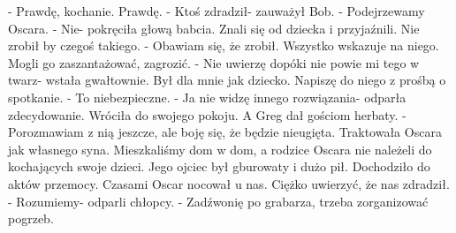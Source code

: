\documentclass[12pt,a4paper]{book}
\begin{document}
- Prawdę, kochanie. Prawdę. 
- Ktoś zdradził- zauważył Bob. 
- Podejrzewamy Oscara. 
- Nie- pokręciła głową babcia. Znali się od dziecka i przyjaźnili. Nie zrobił by czegoś takiego. 
- Obawiam się, że zrobił. Wszystko wskazuje na niego. Mogli go zaszantażować, zagrozić. 
- Nie uwierzę dopóki nie powie mi tego w twarz- wstała gwałtownie. Był dla mnie jak dziecko. Napiszę do niego z prośbą o spotkanie. 
- To niebezpieczne. 
- Ja nie widzę innego rozwiązania- odparła zdecydowanie. 
Wróciła do swojego pokoju. A Greg dał gościom herbaty. 
- Porozmawiam z nią jeszcze, ale boję się, że będzie nieugięta. Traktowała Oscara jak własnego syna. Mieszkaliśmy dom w dom, a rodzice Oscara nie należeli do kochających swoje dzieci. Jego ojciec był gburowaty i dużo pił. Dochodziło do aktów przemocy. Czasami Oscar nocował u nas. Ciężko uwierzyć, że nas zdradził. 
- Rozumiemy- odparli chłopcy. 
- Zadźwonię po grabarza, trzeba zorganizować pogrzeb. 
                           
\end{document}
